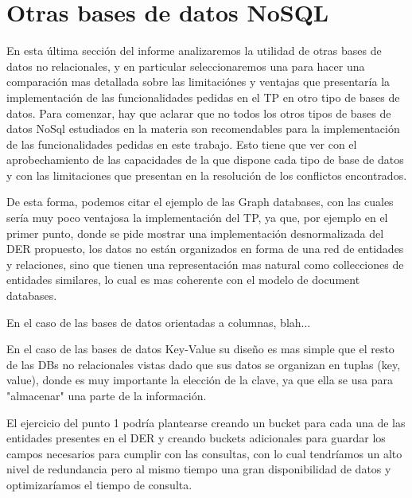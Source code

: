 \section{Otras bases de datos NoSQL}

En esta \'ultima secci\'on del informe analizaremos la utilidad de otras bases de datos no relacionales, y en particular seleccionaremos una para hacer una comparaci\'on mas detallada sobre las limitaci\'ones y ventajas que presentar\'ia la implementaci\'on de las funcionalidades pedidas en el TP en otro tipo de bases de datos. Para comenzar, hay que aclarar que no todos los otros tipos de bases de datos NoSql estudiados en la materia son recomendables para la implementaci\'on de las funcionalidades pedidas en este trabajo. Esto tiene que ver con el aprobechamiento de las capacidades de la que dispone cada tipo de base de datos y con las limitaciones que presentan en la resoluci\'on de los conflictos encontrados. 

De esta forma, podemos citar el ejemplo de las Graph databases, con las cuales ser\'ia muy poco ventajosa la implementaci\'on del TP, ya que, por ejemplo en el primer punto, donde se pide mostrar una implementaci\'on desnormalizada del DER propuesto, los datos no est\'an organizados en forma de una red de entidades y relaciones, sino que tienen una representaci\'on mas natural como collecciones de entidades similares, lo cual es mas coherente con el modelo de document databases.

En el caso de las bases de datos orientadas a columnas, blah...

En el caso de las bases de datos Key-Value su dise\~no es mas simple que el resto de las DBs no relacionales vistas dado que sus datos se organizan en tuplas (key, value), donde es muy importante la elecci\'on de la clave, ya que ella se usa para "almacenar" una parte de la informaci\'on. 

El ejercicio del punto 1 podr\'ia plantearse creando un bucket para cada una de las entidades presentes en el DER y creando buckets adicionales para guardar los campos necesarios para cumplir con las consultas, con lo cual tendr\'iamos un alto nivel de redundancia pero al mismo tiempo una gran disponibilidad de datos y optimizar\'iamos el tiempo de consulta.



